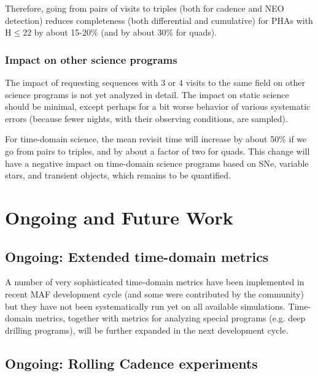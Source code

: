 Therefore, going from pairs of visits to triples (both for cadence and
NEO detection) reduces completeness (both differential and cumulative)
for PHAs with H$\le$22 by about 15-20\% (and by about 30\% for quads).


\subsubsection{Impact on other science programs}

The impact of requesting sequences with 3 or 4 visits to the same
field on other science programs is not yet analyzed in detail.  The
impact on static science should be minimal, except perhaps for a bit
worse behavior of various systematic errors (because fewer nights,
with their observing conditions, are sampled).

For time-domain science, the mean revisit time will increase by about
50\% if we go from pairs to triples, and by about a factor of two for
quads. This change will have a negative impact on time-domain science
programs based on SNe, variable stars, and transient objects, which
remains to be quantified.

\navigationbar





\section{Ongoing and Future Work}
\def\secname{cadexp:ongoing}\label{sec:\secname}


\subsection{Ongoing: Extended time-domain metrics}

A number of very sophisticated time-domain metrics have been
implemented in recent MAF development cycle (and some were contributed
by the community) but they have not been systematically run yet on all
available simulations. Time-domain metrics, together with metrics for
analyzing special programs (e.g. deep drilling programs), will be
further expanded in the next development cycle.


\subsection{Ongoing: Rolling Cadence experiments}

